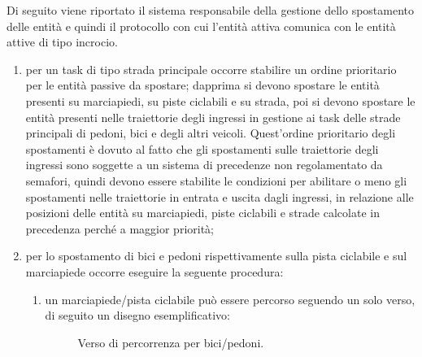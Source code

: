 Di seguito viene riportato il sistema responsabile della gestione dello spostamento delle entità e quindi il protocollo con cui l'entità attiva comunica con le entità attive di tipo incrocio. 
\begin{enumerate}
\item per un task di tipo strada principale occorre stabilire un ordine prioritario per le entità passive da spostare; dapprima si devono spostare le entità presenti su marciapiedi, su piste ciclabili e su strada, poi si devono spostare le entità presenti nelle traiettorie degli ingressi in gestione ai task delle strade principali di pedoni, bici e degli altri veicoli. 
Quest'ordine prioritario degli spostamenti è dovuto al fatto che gli spostamenti
sulle traiettorie degli ingressi sono soggette a un sistema di precedenze non regolamentato da semafori, quindi devono essere stabilite le condizioni per abilitare o meno gli spostamenti nelle traiettorie in entrata e uscita dagli ingressi, in relazione alle posizioni delle entità su marciapiedi, piste ciclabili e strade calcolate in precedenza perché a maggior priorità;
\item per lo spostamento di bici e pedoni rispettivamente sulla pista ciclabile e sul marciapiede occorre eseguire la seguente procedura:
\begin{enumerate}
\item un marciapiede/pista ciclabile può essere percorso seguendo un solo verso,
di seguito un disegno esemplificativo:

\begin{figure}[H] %
\caption{Verso di percorrenza per bici/pedoni.}
\label{fig:Verso di percorrenza per bici/pedoni}
\end{figure}




\end{enumerate}
\end{enumerate}
